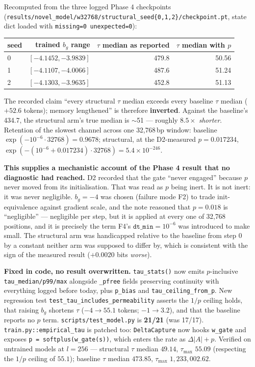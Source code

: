 \documentclass[11pt,a4paper]{article}
\newcommand{\code}[1]{\texttt{\small #1}}
\begin{document}
Recomputed from the three logged Phase 4 checkpoints
(\code{results/novel\_model/w32768/structural\_seed\{0,1,2\}/checkpoint.pt},
state dict loaded with \code{missing=0 unexpected=0}):

\begin{center}
\begin{tabular}{lrrr}
\hline
seed & trained $b_g$ range & $\tau$ median as reported & $\tau$ median with $p$ \\
\hline
0 & $[-4.1452, -3.9839]$ & 479.8 & 50.56 \\
1 & $[-4.1107, -4.0066]$ & 487.6 & 51.24 \\
2 & $[-4.1303, -3.9635]$ & 452.8 & 51.13 \\
\hline
\end{tabular}
\end{center}

The recorded claim ``every structural $\tau$ median exceeds every baseline
$\tau$ median ($+52.6$ tokens); memory lengthened'' is therefore
\textbf{inverted}. Against the baseline's 434.7, the structural arm's true
median is $\sim$51 --- roughly $8.5\times$ \emph{shorter}. Retention of the
slowest channel across one 32{,}768\,bp window: baseline
$\exp(-10^{-6}\cdot 32768) = 0.9678$; structural, at the D2-measured
$p = 0.017234$, $\exp(-(10^{-6}+0.017234)\cdot 32768) = 5.4\times10^{-246}$.

\textbf{This supplies a mechanistic account of the Phase 4 result that no
diagnostic had reached.} D2 recorded that the gate ``never engaged'' because
$p$ never moved from its initialisation. That was read as $p$ being inert. It
is not inert: it was never negligible. $b_g = -4$ was chosen (failure mode F2)
to trade init-equivalence against gradient scale, and the note reasoned that
$p = 0.018$ is ``negligible'' --- negligible per step, but it is applied at
every one of 32{,}768 positions, and it is precisely the term F4's
$\mathtt{dt\_min} = 10^{-6}$ was introduced to make small. The structural arm
was handicapped relative to the baseline from step 0 by a constant neither arm
was supposed to differ by, which is consistent with the sign of the measured
result ($+0.0020$ bits \emph{worse}).

\textbf{Fixed in code, no result overwritten.} \code{tau\_stats()} now emits
$p$-inclusive \code{tau\_median/p99/max} alongside \code{*\_pfree} fields
preserving continuity with everything logged before today, plus \code{p\_bias}
and \code{tau\_ceiling\_from\_p}. New regression test
\code{test\_tau\_includes\_permeability} asserts the $1/p$ ceiling holds, that
raising $b_g$ shortens $\tau$ ($-4 \to 55.1$ tokens; $-1 \to 3.2$), and that
the baseline reports no $p$ term. \code{scripts/test\_model.py} is
\textbf{21/21} (was 17/17). \code{train.py::empirical\_tau} is patched too:
\code{DeltaCapture} now hooks \code{w\_gate} and exposes
\code{p = softplus(w\_gate(s))}, which enters the rate as
$\Delta|A| + p$. Verified on untrained models at $l = 256$ --- structural
$\tau$ median $49.14$, $\tau_{\max}$ $55.09$ (respecting the $1/p$ ceiling of
$55.1$); baseline $\tau$ median $473.85$, $\tau_{\max}$ $1{,}233{,}002.62$.
\end{document}
